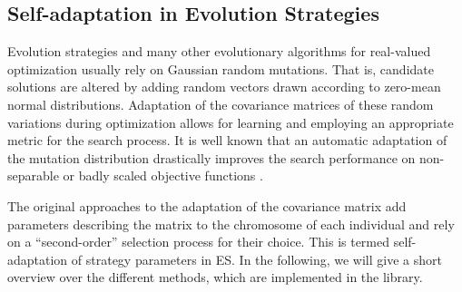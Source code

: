 \newcommand{\btb}{^{(t)}}
\newcommand{\btprevb}{^{(t-1)}}
\newcommand{\btnextb}{^{(t+1)}}


\renewcommand{\vec}[1]{\mathbf{#1}} %
\newcommand{\eqdef}{=}

\subsection{Self-adaptation in Evolution Strategies}

Evolution strategies and many other evolutionary algorithms for
real-valued optimization usually rely on Gaussian random mutations. That is,
candidate solutions are altered by adding random vectors drawn
according to zero-mean normal distributions.  Adaptation of the
covariance matrices of these random variations during optimization
allows for learning and employing an appropriate metric for the search
process.  It is well known that an automatic adaptation of the
mutation distribution drastically improves the search performance on
non-separable or badly scaled objective functions
\cite{Rechenberg:94,Schwefel:95,hansen:01,beyer:02b,kern:04}.


 The original approaches to the adaptation of the covariance matrix 
add  parameters describing the matrix to the chromosome of each individual and rely
on a ``second-order'' selection process for their choice. This is
termed self-adaptation of strategy parameters in ES. In the following, we
will give a short overview over the different methods, which are
implemented in the library.

